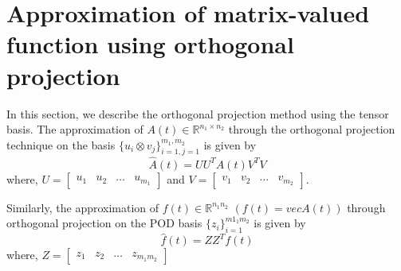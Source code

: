 \documentclass{article}
\begin{document}
\section{Approximation of matrix-valued function using orthogonal projection}\label{sec:OrthogonalProjection}
In this section, we describe the orthogonal projection method using the tensor basis.
The approximation of $A(t) \in \mathbb{R}^{n_1 \times n_2}$ through the orthogonal projection technique on the basis $\{u_i \otimes v_j\}_{i=1,j=1}^{m_1,m_2}$ is given by
\begin{equation}\label{eqa1}
    \hat{A}(t)=UU^TA(t)V^TV
\end{equation}
where, $U=\begin{bmatrix}
    u_1 & u_2 & \dots & u_{m_1}
\end{bmatrix}$ and $V=\begin{bmatrix}
    v_1 & v_2 & \dots & v_{m_2}
\end{bmatrix}$.

Similarly, the approximation of $f(t) \in \mathbb{R}^{n_1n_2}$ $(f(t)=vecA(t))$ through orthogonal projection on the POD basis $\{z_i\}_{i=1}^{m1_1m_2}$ is given by
\begin{equation}
    \hat{f}(t)=ZZ^Tf(t)
\end{equation}
where, $Z=\begin{bmatrix}
    z_1 & z_2 & \dots & z_{m_1m_2}
\end{bmatrix}$


%   
\end{document}
